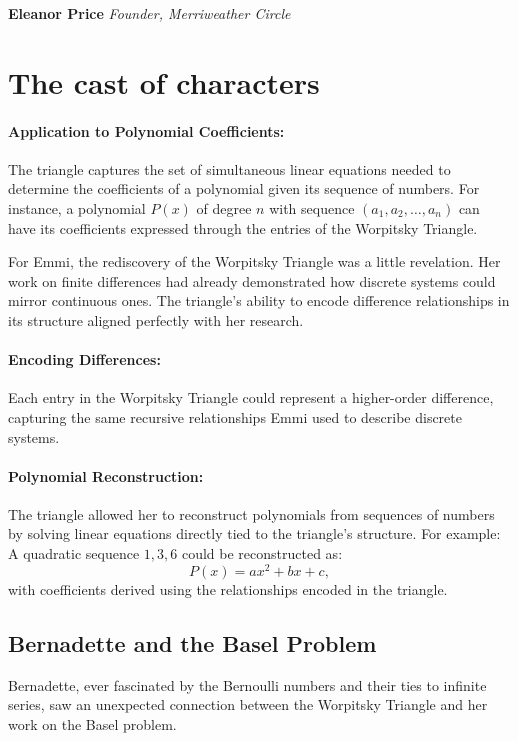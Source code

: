 \bigskip
\textbf{Eleanor Price}  \textit{Founder, Merriweather Circle}

\newpage
\section*{The cast of characters}
\paragraph{Application to Polynomial Coefficients:} The triangle captures the set of simultaneous linear equations needed to determine the coefficients of a polynomial given its sequence of numbers. For instance, a polynomial \(P(x)\) of degree \(n\) with sequence \((a_1, a_2, \dots, a_n)\) can have its coefficients expressed through the entries of the Worpitsky Triangle.

For Emmi, the rediscovery of the Worpitsky Triangle was a little revelation. Her work on finite differences had already demonstrated how discrete systems could mirror continuous ones. The triangle’s ability to encode difference relationships in its structure aligned perfectly with her research.

\paragraph{Encoding Differences:} Each entry in the Worpitsky Triangle could represent a higher-order difference, capturing the same recursive relationships Emmi used to describe discrete systems.

\paragraph{Polynomial Reconstruction:} The triangle allowed her to reconstruct polynomials from sequences of numbers by solving linear equations directly tied to the triangle’s structure. For example:
A quadratic sequence \(1, 3, 6\) could be reconstructed as:
\[
P(x) = ax^2 + bx + c,
\]
with coefficients derived using the relationships encoded in the triangle.

\subsection*{Bernadette and the Basel Problem}
Bernadette, ever fascinated by the Bernoulli numbers and their ties to infinite series, saw an unexpected connection between the Worpitsky Triangle and her work on the Basel problem.

